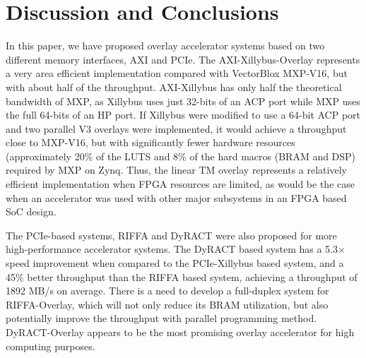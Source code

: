 \section{Discussion and Conclusions}
In this paper, we have proposed overlay accelerator systems based on two different memory interfaces, AXI and PCIe. 
The AXI-Xillybus-Overlay represents a very area efficient implementation compared with VectorBlox MXP-V16, but with about half of the throughput. 
AXI-Xillybus has only half the theoretical bandwidth of MXP, as Xillybus uses just 32-bits of an ACP port while MXP uses the full 64-bits of an HP port. 
If Xillybus were modified to use a 64-bit ACP port and two parallel V3 overlays were implemented, it would achieve a throughput close to MXP-V16, but with significantly fewer hardware resources (approximately 20\% of the LUTS and 8\% of the hard macros (BRAM and DSP) required by MXP on Zynq.
Thus, the linear TM overlay represents a relatively efficient implementation when FPGA resources are limited, as would be the case when an accelerator was used with other major subsystems in an FPGA based SoC design.

The PCIe-based systems, RIFFA and DyRACT were also proposed for more high-performance accelerator systems.
The DyRACT based system has a 5.3$\times$ speed improvement when compared to the PCIe-Xillybus based system, and a 45\% better throughput than the RIFFA based system, achieving a throughput of 1892 MB/s on average.
There is a need to develop a full-duplex system for RIFFA-Overlay, which will not only reduce its BRAM utilization, but also potentially improve the throughput with parallel programming method. 
DyRACT-Overlay appears to be the most promising overlay accelerator for high computing purposes. 

